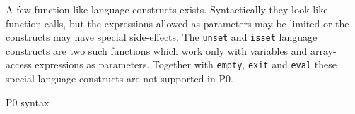 A few function-like language constructs exists. Syntactically they look like function calls, but the expressions allowed as parameters may be limited or the constructs may have special side-effects. The \texttt{unset} and \texttt{isset} language constructs are two such functions which work only with variables and array-access expressions as parameters. Together with \texttt{empty}, \texttt{exit} and \texttt{eval} these special language constructs are not supported in P0.

\begin{grammarf}
\centering
{\scriptsize }
\caption{P0 syntax }
\label{gramm:p0}
\end{grammarf}